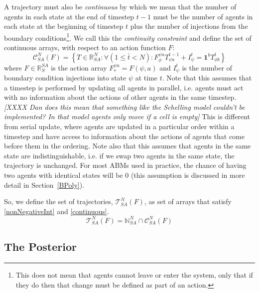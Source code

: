 \documentclass{article}
\begin{document}
A trajectory must also be \textit{continuous} by which we mean that the number of agents in each state at the end of timestep $t-1$ must be the number of agents in each state at the beginning of timestep $t$ plus the number of injections from the boundary conditions\footnote{This does not mean that agents cannot leave or enter the system, only that if they do then that change must be defined as part of an action.}. We call this the \textit{continuity constraint} and define the set of continuous arrays, with respect to an action function $F$:
\begin{equation}
\mathcal{C}^N_{SA}(F) = \left\{T\in\mathbb{R}^N_{SA}:  \forall \left(  1 \le \bar t < N\right): F^{\psi a}_{\phi} T^{t-1}_{\psi a} + I^t_\psi = \mathbf{1}^bT^{t}_{\phi b} \right\}
\label{continuous}
\end{equation}
where $F \in \mathbb{R}^{SA}_S$ is the action array $F^{\psi a}_* = F(\psi, a)$ and $I^t_\psi$ is the number of boundary condition injections into state $\psi$ at time $t$. Note that this assumes that a timestep is performed by updating all agents in parallel, i.e. agents must act with no information about the actions of other agents in the same timestep. \textit{[XXXX Dan does this mean that something like the Schelling model couldn't be implemented? In that model agents only move if a cell is empty]} This is different from serial update, where agents are updated in a particular order within a timestep and have access to information about the actions of agents that come before them in the ordering. Note also that this assumes that agents in the same state are indistinguishable, i.e. if we swap two agents in the same state, the trajectory is unchanged. For most ABMs used in practice, the chance of having two agents with identical states will be $0$ (this assumption is discussed in more detail in Section~\ref{BPoly}).


So, we define the set of trajectories, $\mathcal{T}^N_{SA}(F)$, as set of arrays that satisfy \eqref{nonNegativeInt} and \eqref{continuous}.
\begin{equation}
\mathcal{T}^N_{SA}(F) = \mathbb{N}^N_{SA} \cap \mathcal{C}^N_{SA}(F)
\label{SetOfTrajectories}
\end{equation}


\subsection{The Posterior}
\end{document}
